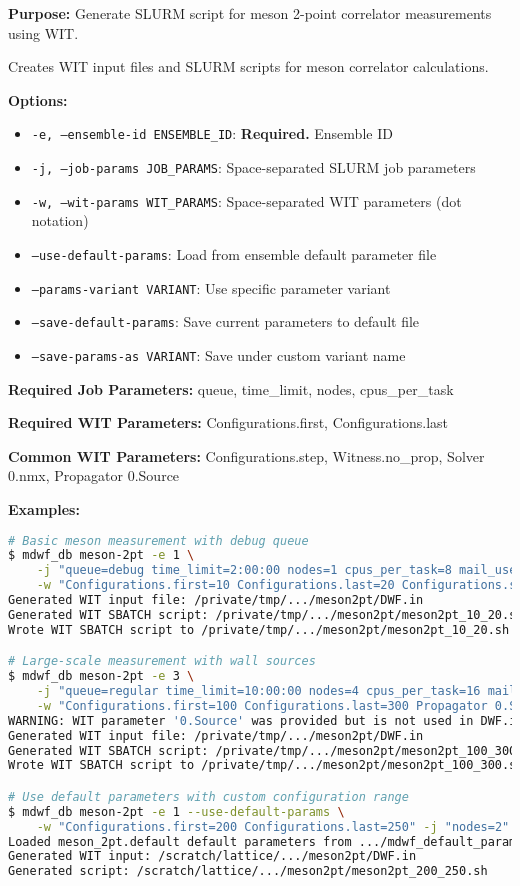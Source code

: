 \documentclass{article}
\begin{document}
\textbf{Purpose:} Generate SLURM script for meson 2-point correlator measurements using WIT.

Creates WIT input files and SLURM scripts for meson correlator calculations.

\textbf{Options:}
\begin{itemize}
\item \texttt{-e, --ensemble-id ENSEMBLE\_ID}: \textbf{Required.} Ensemble ID
\item \texttt{-j, --job-params JOB\_PARAMS}: Space-separated SLURM job parameters
\item \texttt{-w, --wit-params WIT\_PARAMS}: Space-separated WIT parameters (dot notation)
\item \texttt{--use-default-params}: Load from ensemble default parameter file
\item \texttt{--params-variant VARIANT}: Use specific parameter variant
\item \texttt{--save-default-params}: Save current parameters to default file
\item \texttt{--save-params-as VARIANT}: Save under custom variant name
\end{itemize}

\textbf{Required Job Parameters:}
queue, time\_limit, nodes, cpus\_per\_task

\textbf{Required WIT Parameters:}
Configurations.first, Configurations.last

\textbf{Common WIT Parameters:}
Configurations.step, Witness.no\_prop, Solver 0.nmx, Propagator 0.Source

\textbf{Examples:}
\begin{lstlisting}[language=bash]
# Basic meson measurement with debug queue
$ mdwf_db meson-2pt -e 1 \
    -j "queue=debug time_limit=2:00:00 nodes=1 cpus_per_task=8 mail_user=test@example.com" \
    -w "Configurations.first=10 Configurations.last=20 Configurations.step=2"
Generated WIT input file: /private/tmp/.../meson2pt/DWF.in
Generated WIT SBATCH script: /private/tmp/.../meson2pt/meson2pt_10_20.sh
Wrote WIT SBATCH script to /private/tmp/.../meson2pt/meson2pt_10_20.sh

# Large-scale measurement with wall sources
$ mdwf_db meson-2pt -e 3 \
    -j "queue=regular time_limit=10:00:00 nodes=4 cpus_per_task=16 mail_user=hpc@university.edu" \
    -w "Configurations.first=100 Configurations.last=300 Propagator 0.Source=Wall"
WARNING: WIT parameter '0.Source' was provided but is not used in DWF.in
Generated WIT input file: /private/tmp/.../meson2pt/DWF.in
Generated WIT SBATCH script: /private/tmp/.../meson2pt/meson2pt_100_300.sh
Wrote WIT SBATCH script to /private/tmp/.../meson2pt/meson2pt_100_300.sh

# Use default parameters with custom configuration range
$ mdwf_db meson-2pt -e 1 --use-default-params \
    -w "Configurations.first=200 Configurations.last=250" -j "nodes=2"
Loaded meson_2pt.default default parameters from .../mdwf_default_params.yaml
Generated WIT input: /scratch/lattice/.../meson2pt/DWF.in
Generated script: /scratch/lattice/.../meson2pt/meson2pt_200_250.sh
\end{lstlisting}
\end{document}
